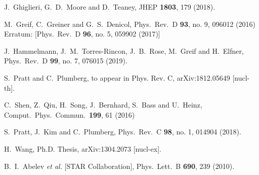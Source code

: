 \documentclass[aps,prc,nofootinbib,showpacs,superscriptaddress,groupedaddress]{revtex4-1}
\begin{document}
\begin{thebibliography}{99}
  J.~Ghiglieri, G.~D.~Moore and D.~Teaney,
  JHEP {\bf 1803}, 179 (2018).
  
  
  M.~Greif, C.~Greiner and G.~S.~Denicol,
  Phys.\ Rev.\ D {\bf 93}, no. 9, 096012 (2016)
  Erratum: [Phys.\ Rev.\ D {\bf 96}, no. 5, 059902 (2017)]
  
  J.~Hammelmann, J.~M.~Torres-Rincon, J.~B.~Rose, M.~Greif and H.~Elfner,
  Phys.\ Rev.\ D {\bf 99}, no. 7, 076015 (2019).

  S.~Pratt and C.~Plumberg,
  to appear in Phys. Rev. C, arXiv:1812.05649 [nucl-th].

  C.~Shen, Z.~Qiu, H.~Song, J.~Bernhard, S.~Bass and U.~Heinz,
  Comput.\ Phys.\ Commun.\  {\bf 199}, 61 (2016)

  S.~Pratt, J.~Kim and C.~Plumberg,
  Phys.\ Rev.\ C {\bf 98}, no. 1, 014904 (2018).

  H.~Wang, Ph.D. Thesis,
  arXiv:1304.2073 [nucl-ex].

  B.~I.~Abelev {\it et al.} [STAR Collaboration],
  Phys.\ Lett.\ B {\bf 690}, 239 (2010).


\end{thebibliography}
\end{document}

